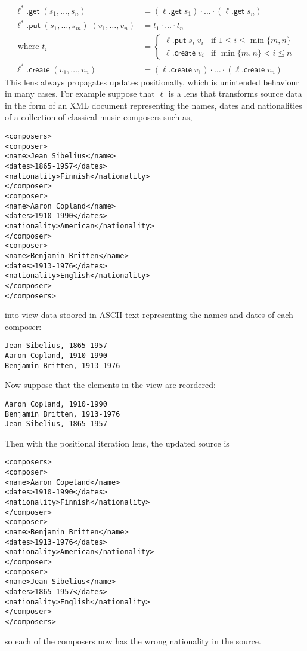 \documentclass[acmsmall,review,anonymous]{acmart}\settopmatter{printfolios=true,printccs=false,printacmref=false}
\theoremstyle{definition}
\newcommand{\kw}[1]{\ensuremath{\mathsf{#1}}\xspace}
\newcommand{\get}{\ensuremath{\kw{get}}\xspace}
\newcommand{\pput}{\ensuremath{\kw{put}}\xspace}
\newcommand{\create}{\ensuremath{\kw{create}}\xspace}
\begin{document}
\begin{align*}
\ell^* .\get \; (s_1, \ldots, s_n) &= (\ell.\get \; s_1) \cdot \ldots
\cdot (\ell.\get \; s_n)\\
\ell^* .\pput \; (s_1, \ldots, s_m) \; (v_1, \ldots, v_n) &= t_1 \cdot
\ldots \cdot t_n\\
\text{ where } t_i &= \begin{cases}
\ell.\pput \; s_i \; v_i & \text{if } 1 \leq i \leq \min\{m, n\}\\
\ell.\create \; v_i & \text{if } \min\{m, n\} < i \leq n
\end{cases}\\
\ell^*.\create \; (v_1, \ldots, v_n) &= (\ell.\create \; v_1) \cdot \ldots
\cdot (\ell.\create \; v_n)
\end{align*}
This lens always propagates updates positionally, which is unintended behaviour
in many cases. For example suppose that $\ell$ is a lens that transforms
source data in the form of an XML document representing the names, dates and
nationalities of a collection of classical music composers such as,

\begin{lstlisting}
<composers>
<composer>
<name>Jean Sibelius</name>
<dates>1865-1957</dates>
<nationality>Finnish</nationality>
</composer>
<composer>
<name>Aaron Copland</name>
<dates>1910-1990</dates>
<nationality>American</nationality>
</composer>
<composer>
<name>Benjamin Britten</name>
<dates>1913-1976</dates>
<nationality>English</nationality>
</composer>
</composers>
\end{lstlisting}
into view data stoored in ASCII text representing the names and dates of each
composer:
\begin{lstlisting}
Jean Sibelius, 1865-1957
Aaron Copland, 1910-1990
Benjamin Britten, 1913-1976
\end{lstlisting}
Now suppose that the elements in the view are reordered:
\begin{lstlisting}
Aaron Copland, 1910-1990
Benjamin Britten, 1913-1976
Jean Sibelius, 1865-1957
\end{lstlisting}
Then with the positional iteration lens, the updated source is
\begin{lstlisting}
<composers>
<composer>
<name>Aaron Copeland</name>
<dates>1910-1990</dates>
<nationality>Finnish</nationality>
</composer>
<composer>
<name>Benjamin Britten</name>
<dates>1913-1976</dates>
<nationality>American</nationality>
</composer>
<composer>
<name>Jean Sibelius</name>
<dates>1865-1957</dates>
<nationality>English</nationality>
</composer>
</composers>
\end{lstlisting}
so each of the composers now has the wrong nationality in the source.
\end{document}
